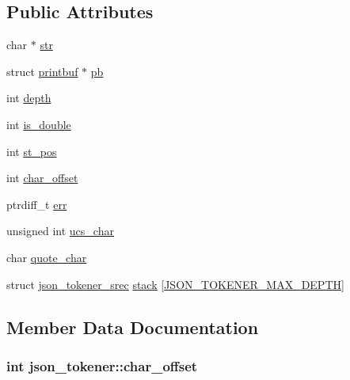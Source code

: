 \subsection*{Public Attributes}
\begin{DoxyCompactItemize}
\item 
char $\ast$ \hyperlink{structjson__tokener_a9772e2170322a19d8da6ce5d7dc46895}{str}
\item 
struct \hyperlink{structprintbuf}{printbuf} $\ast$ \hyperlink{structjson__tokener_a1cdc7f85d7bde95f81bb08b7e61d6684}{pb}
\item 
int \hyperlink{structjson__tokener_ae0e5102b44cc1fc680be3e0fb5fff028}{depth}
\item 
int \hyperlink{structjson__tokener_ad3bf0aa728ea14549d5aa6ca8dcba070}{is\+\_\+double}
\item 
int \hyperlink{structjson__tokener_a8eed213c0a37d09c1df66c8567e44471}{st\+\_\+pos}
\item 
int \hyperlink{structjson__tokener_a9daae2516fd6df23555d33ef01020a76}{char\+\_\+offset}
\item 
ptrdiff\+\_\+t \hyperlink{structjson__tokener_acc71f03c5d2edbcb5a036a906e8c2faf}{err}
\item 
unsigned int \hyperlink{structjson__tokener_a32fa73e43fb760e6845231a8482eb064}{ucs\+\_\+char}
\item 
char \hyperlink{structjson__tokener_aea488b73085ac7c5969ae7fc29e25fa0}{quote\+\_\+char}
\item 
struct \hyperlink{structjson__tokener__srec}{json\+\_\+tokener\+\_\+srec} \hyperlink{structjson__tokener_a1499f97597246a18357b874e1805a678}{stack} \mbox{[}\hyperlink{json__tokener_8h_ac4299cf4ed799b028e61cf7b2b0d5f1f}{J\+S\+O\+N\+\_\+\+T\+O\+K\+E\+N\+E\+R\+\_\+\+M\+A\+X\+\_\+\+D\+E\+P\+TH}\mbox{]}
\end{DoxyCompactItemize}


\subsection{Member Data Documentation}
\subsubsection[{\texorpdfstring{char\+\_\+offset}{char_offset}}]{\setlength{\rightskip}{0pt plus 5cm}int json\+\_\+tokener\+::char\+\_\+offset}\hypertarget{structjson__tokener_a9daae2516fd6df23555d33ef01020a76}{}\label{structjson__tokener_a9daae2516fd6df23555d33ef01020a76}
